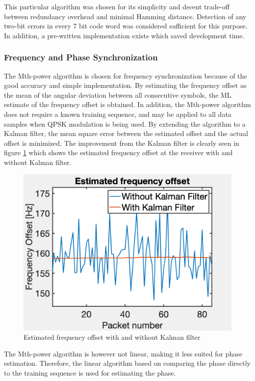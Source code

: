 This particular algorithm was chosen for its simplicity and decent trade-off between redundancy overhead and minimal Hamming distance. Detection of any two-bit errors in every 7 bit code word was considered sufficient for this purpose. In addition, a pre-written implementation exists \cite{hamming} which saved development time. %

\subsubsection{Frequency and Phase Synchronization}
The Mth-power algorithm is chosen for frequency synchronization because of the good accuracy and simple implementation. By estimating the frequency offset as the mean of the angular deviation between all consecutive symbols, the ML estimate of the frequency offset is obtained. In addition, the Mth-power algorithm does not require a known training sequence, and may be applied to all data samples when QPSK modulation is being used. By extending the algorithm to a Kalman filter, the mean square error between the estimated offset and the actual offset is minimized. The improvement from the Kalman filter is clearly seen in figure \ref{fig:kalman_freq} which shows the estimated frequency offset at the receiver with and without Kalman filter.

\begin{figure}[htbp]
\centering
\includegraphics[width=\figW\linewidth]{KalmanFreq.png}
\caption{Estimated frequency offset with and without Kalman filter}
\label{fig:kalman_freq}

\end{figure}

The Mth-power algorithm is however not linear, making it less suited for phase estimation. Therefore, the linear algorithm based on comparing the phase directly to the training sequence is used for estimating the phase.
 





